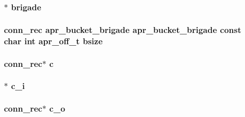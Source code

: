 \subsubsection[{\texorpdfstring{brigade}{brigade}}]{$\ast$ brigade}\hypertarget{group__MOD__PROXY_ga0a451b56abc335df106dcebf36975b0f}{}\label{group__MOD__PROXY_ga0a451b56abc335df106dcebf36975b0f}
\subsubsection[{\texorpdfstring{bsize}{bsize}}]{ {\bf conn\+\_\+rec} {\bf apr\+\_\+bucket\+\_\+brigade} {\bf apr\+\_\+bucket\+\_\+brigade} const char {\bf int} {\bf apr\+\_\+off\+\_\+t} bsize}\hypertarget{group__MOD__PROXY_ga99aa71807e3d8959b13eb4684c9d1ee9}{}\label{group__MOD__PROXY_ga99aa71807e3d8959b13eb4684c9d1ee9}
\subsubsection[{\texorpdfstring{c}{c}}]{ {\bf conn\+\_\+rec}$\ast$ c}\hypertarget{group__MOD__PROXY_ga3c85ea2e13450e203c2cfba3172effdc}{}\label{group__MOD__PROXY_ga3c85ea2e13450e203c2cfba3172effdc}
\subsubsection[{\texorpdfstring{c\+\_\+i}{c_i}}]{$\ast$ c\+\_\+i}\hypertarget{group__MOD__PROXY_gae8b7200fc364117dfbb25c6bf1e3f1b9}{}\label{group__MOD__PROXY_gae8b7200fc364117dfbb25c6bf1e3f1b9}
\subsubsection[{\texorpdfstring{c\+\_\+o}{c_o}}]{ {\bf conn\+\_\+rec}$\ast$ c\+\_\+o}\hypertarget{group__MOD__PROXY_ga93cf2486ee57f9d8ec247c8a8b304202}{}\label{group__MOD__PROXY_ga93cf2486ee57f9d8ec247c8a8b304202}

